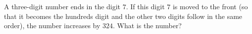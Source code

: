A three-digit number ends in the digit $7$. If this digit $7$ is moved to the front (so that it becomes the hundreds digit and the other two digits follow in the same order), the number increases by $324$. What is the number?
